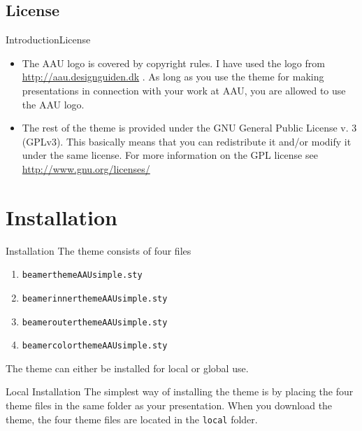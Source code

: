 \documentclass[10pt]{beamer}
\newcommand{\chref}[2]{%
  \href{#1}{{\usebeamercolor[bg]{AAUsimple}#2}}%
}
\begin{document}
\subsection{License}
\begin{frame}{Introduction}{License}
  \begin{itemize}
    \item<1-> The AAU logo is covered by copyright rules. I have used the logo from \chref{http://aau.designguiden.dk}{http://aau.designguiden.dk}. As long as you use the theme for making presentations in connection with your work at AAU, you are allowed to use the AAU logo.
    \item<2-> The rest of the theme is provided under the GNU General Public License v. 3 (GPLv3). This basically means that you can redistribute it and/or modify it under the same license. For more information on the GPL license see \chref{http://www.gnu.org/licenses/}{http://www.gnu.org/licenses/}
  \end{itemize}
\end{frame}

\section{Installation}
\begin{frame}{Installation}
  The theme consists of four files
  \begin{enumerate}
    \item {\tt beamerthemeAAUsimple.sty}
    \item {\tt beamerinnerthemeAAUsimple.sty}
    \item {\tt beamerouterthemeAAUsimple.sty}
    \item {\tt beamercolorthemeAAUsimple.sty}
  \end{enumerate}
  The theme can either be installed for local or global use.
  \pause
  \begin{block}{Local Installation}
    The simplest way of installing the theme is by placing the four theme files in the same folder as your presentation. When you download the theme, the four theme files are located in the {\tt local} folder.
  \end{block}
\end{frame}
\end{document}

